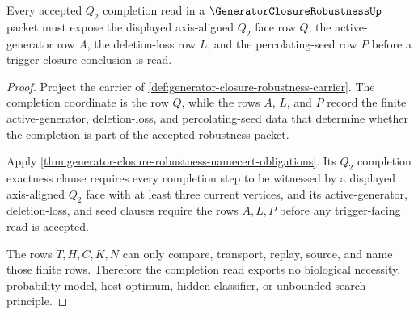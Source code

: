 \begin{theorem}
\label{thm:generator-closure-robustness-q2-completion-exactness}
Every accepted $Q_{2}$ completion read in a $\GeneratorClosureRobustnessUp$ packet must expose the displayed axis-aligned $Q_{2}$ face row $Q$, the active-generator row $A$, the deletion-loss row $L$, and the percolating-seed row $P$ before a trigger-closure conclusion is read.
\end{theorem}
\begin{proof}
Project the carrier of \autoref{def:generator-closure-robustness-carrier}. The completion coordinate is the row $Q$, while the rows $A$, $L$, and $P$ record the finite active-generator, deletion-loss, and percolating-seed data that determine whether the completion is part of the accepted robustness packet.

Apply \autoref{thm:generator-closure-robustness-namecert-obligations}. Its $Q_{2}$ completion exactness clause requires every completion step to be witnessed by a displayed axis-aligned $Q_{2}$ face with at least three current vertices, and its active-generator, deletion-loss, and seed clauses require the rows $A,L,P$ before any trigger-facing read is accepted.

The rows $T,H,C,K,N$ can only compare, transport, replay, source, and name those finite rows. Therefore the completion read exports no biological necessity, probability model, host optimum, hidden classifier, or unbounded search principle.
\end{proof}

